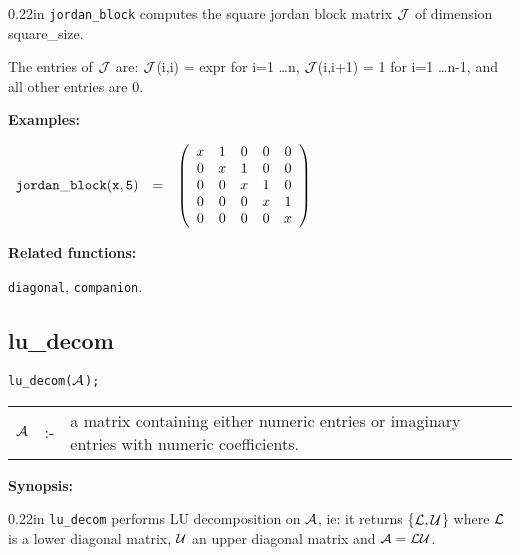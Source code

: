 \begin{addtolength}{\leftskip}{0.22in}
{\tt jordan\_block} computes the square jordan block matrix ${\cal J}$
                of dimension square\_size.

The entries of ${\cal J}$ are:
                ${\cal J}$(i,i) = expr for i=1
                \ldots n, ${\cal J}$(i,i+1) = 1 for i=1
                \ldots n-1, and all other entries are 0.

\end{addtolength}

{\bf Examples:}

\begin{flushleft}
\hspace*{0.1in}
\begin{math}
\begin{array}{ccc}
{\tt jordan\_block(x,5)} & = &
\left( \begin{array}{ccccc} x & 1 & 0 & 0 & 0 \\ 0 & x & 1 & 0 & 0 \\ 0
& 0 & x & 1 & 0 \\ 0 & 0 & 0 & x & 1 \\ 0 & 0 & 0 & 0 & x
\end{array} \right)
\end{array}
\end{math}
\end{flushleft}

{\bf Related functions:}

\hspace*{0.175in} {\tt diagonal}, {\tt companion}.


\subsection{lu\_decom}


\hspace*{0.175in} {\tt lu\_decom(${\cal A}$);}

\hspace*{0.1in}
\begin{tabular}{l l l}
${\cal A}$ &:-& \parbox[t]{.848\linewidth}{a matrix containing either
numeric entries or imaginary entries with numeric coefficients.}
\end{tabular}

{\bf Synopsis:} %

\begin{addtolength}{\leftskip}{0.22in}
              {\tt lu\_decom} performs LU decomposition on ${\cal A}$,
              ie: it returns \{${\cal L,U}$\} where ${\cal L}$
              is a lower diagonal matrix, ${\cal U}$ an upper diagonal
              matrix and ${\cal A} = {\cal LU}$.

\end{addtolength}

